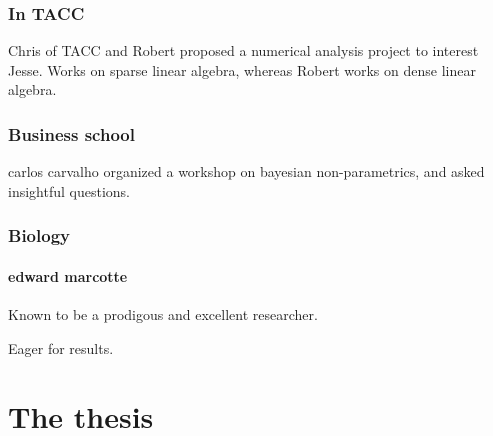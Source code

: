 \documentclass[oneside, article]{memoir}
\begin{document}
\subsection{In TACC}
Chris of TACC and Robert proposed a numerical analysis project to interest Jesse. Works on sparse linear algebra, whereas Robert works on dense linear algebra.

\subsection{Business school}
carlos carvalho organized a workshop on bayesian non-parametrics, and asked insightful questions.

\subsection{Biology}
\subsubsection{edward marcotte}
Known to be a prodigous and excellent researcher.

Eager for results.

\chapter{The thesis}
\end{document}

